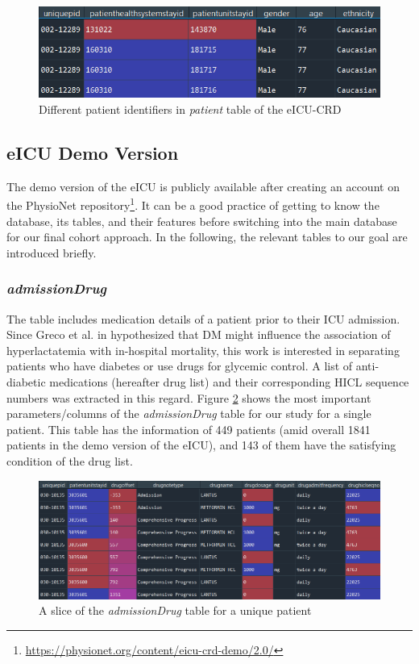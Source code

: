 \begin{figure}[ht]
\centering
\includegraphics[width=14cm]{fig/chapter3/patient_mod.png}
\caption{Different patient identifiers in \textit{patient} table of the \acrshort{eICU-CRD}}
\label{fig:patienttable}
\end{figure}

\subsection{eICU Demo Version}

The demo version of the \acrshort{eICU} is publicly available after creating an account on the PhysioNet repository\footnote{\href{https://physionet.org/content/eicu-crd-demo/2.0/}{https://physionet.org/content/eicu-crd-demo/2.0/}}. It can be a good practice of getting to know the database, its tables, and their features before switching into the main database for our final cohort approach. In the following, the relevant tables to our goal are introduced briefly.

\subsubsection{\textit{admissionDrug}}
The table includes medication details of a patient prior to their \acrshort{ICU} admission. Since Greco et al. in \cite{greco_diabetes_2018} hypothesized that \acrshort{DM} might influence the association of hyperlactatemia with in-hospital mortality, this work is interested in separating patients who have diabetes or use drugs for glycemic control. A list of anti-diabetic medications (hereafter drug list) and their corresponding \acrshort{HICL} sequence numbers was extracted in this regard. Figure \ref{fig:admissiondrug} shows the most important parameters/columns of the \textit{admissionDrug} table for our study for a single patient. This table has the information of 449 patients (amid overall 1841 patients in the demo version of the \acrshort{eICU}), and 143 of them have the satisfying condition of the drug list.

\begin{figure}[ht]
\centering
\includegraphics[width=15cm]{fig/chapter3/admissiondrug_m.png}
\caption{A slice of the \textit{admissionDrug} table for a unique patient}
\label{fig:admissiondrug}
\end{figure}

